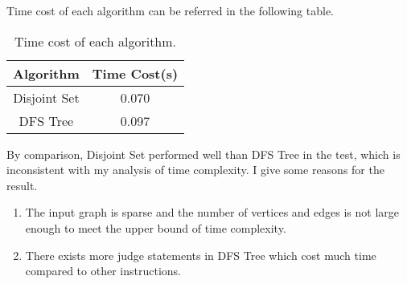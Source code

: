 \documentclass{article}
\begin{document}
	Time cost of each algorithm can be referred in the following table. \vspace{9em}
	\begin{table}[h]
		\centering
		\begin{tabular}{c|c}
			Algorithm & Time Cost(s) \\\hline
			Disjoint Set & 0.070 \\
			DFS Tree & 0.097
		\end{tabular}
		\caption{\label{tab:widgets}Time cost of each algorithm.}
	\end{table}

	By comparison, Disjoint Set performed well than DFS Tree in the test, which is inconsistent with my analysis of time complexity. I give some reasons for the result.
	
	\begin{enumerate}
		\item The input graph is sparse and the number of vertices and edges is not large enough to meet the upper bound of time complexity.
		\item There exists more judge statements in DFS Tree which cost much time compared to other instructions.
	\end{enumerate}
	
	

	
\end{document}
